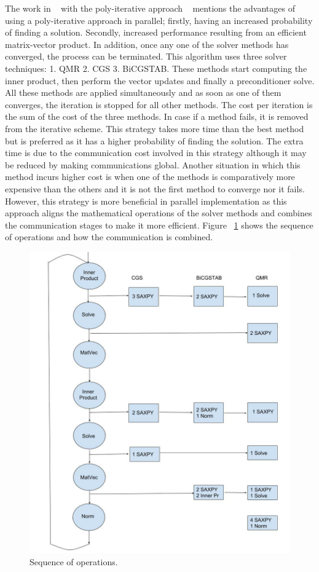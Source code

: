 The work in ~\cite{bombardment} with the poly-iterative approach ~\cite{earliest1,poly1,poly2} mentions the advantages of using a poly-iterative approach in parallel; firstly, having an increased probability of finding a solution. Secondly, increased performance resulting from an efficient matrix-vector product. In addition, once any one of the solver methods has converged, the process can be terminated. This algorithm uses three solver techniques: 1. QMR 2. CGS 3. BiCGSTAB. These methods start computing the inner product, then perform the vector updates and finally a preconditioner solve. All these methods are applied simultaneously and as soon as one of them converges, the iteration is stopped for all other methods. The cost per iteration is the sum of the cost of the three methods. In case if a method fails, it is removed from the iterative scheme. This strategy takes more time than the best method but is preferred as it has a higher probability of finding the solution. The extra time is due to the communication cost involved in this strategy although it may be reduced by making communications global. Another situation in which this method incurs higher cost is when one of the methods is comparatively more expensive than the others and it is not the first method to converge nor it fails. However, this strategy is more beneficial in parallel implementation as this approach aligns the mathematical operations of the solver methods and combines the communication stages to make it more efficient. Figure ~\ref{fig:bombardment} shows the sequence of operations and how the communication is combined. 
\begin{figure}[htp]
\begin{center}
 \includegraphics[width=0.7\linewidth]{figures/bombardment.jpg}
\end{center}
 \caption{Sequence of operations.}
 \label{fig:bombardment}
\end{figure}


